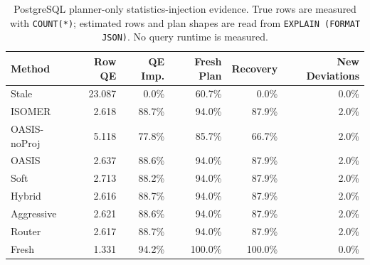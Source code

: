 \begin{table}[t]
  \centering
  \small
  \caption{PostgreSQL planner-only statistics-injection evidence. True rows are measured with \texttt{COUNT(*)}; estimated rows and plan shapes are read from \texttt{EXPLAIN (FORMAT JSON)}. No query runtime is measured.}
  \label{tab:postgres_planner_stats_injection}
  \setlength{\tabcolsep}{4pt}
  \begin{tabular}{lrrrrr}
    \toprule
    Method & Row QE & QE Imp. & Fresh Plan & Recovery & New Deviations \\
    \midrule
    Stale & 23.087 & 0.0\% & 60.7\% & 0.0\% & 0.0\% \\
    ISOMER & 2.618 & 88.7\% & 94.0\% & 87.9\% & 2.0\% \\
    OASIS-noProj & 5.118 & 77.8\% & 85.7\% & 66.7\% & 2.0\% \\
    OASIS & 2.637 & 88.6\% & 94.0\% & 87.9\% & 2.0\% \\
    Soft & 2.713 & 88.2\% & 94.0\% & 87.9\% & 2.0\% \\
    Hybrid & 2.616 & 88.7\% & 94.0\% & 87.9\% & 2.0\% \\
    Aggressive & 2.621 & 88.6\% & 94.0\% & 87.9\% & 2.0\% \\
    Router & 2.617 & 88.7\% & 94.0\% & 87.9\% & 2.0\% \\
    Fresh & 1.331 & 94.2\% & 100.0\% & 100.0\% & 0.0\% \\
    \bottomrule
  \end{tabular}
\end{table}
